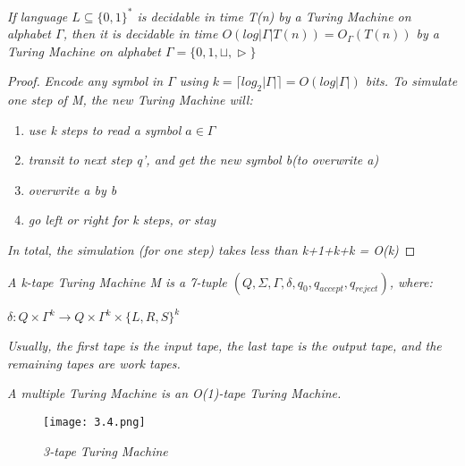\documentclass{article}
\begin{document}
\begin{lemma}
    \textit{If language $L\subseteq \{0,1\}^*$ is decidable in time T(n) by a Turing Machine on alphabet $\varGamma$, then it is decidable in time $O(log|\varGamma| T(n)) = O_\varGamma(T(n))$ by a Turing Machine on alphabet $\varGamma = \{0,1,\sqcup,\vartriangleright  \}$}

    \begin{proof}
        \textit{Encode any symbol in $\varGamma$ using $k = \lceil log_2|\varGamma|\rceil = O(log|\varGamma|)$ bits. To simulate one step of M, the new Turing Machine will:}

        \begin{enumerate}
            \item \textit{use k steps to read a symbol $a\in \varGamma$}
            \item \textit{transit to next step q', and get the new symbol b(to overwrite a)}
            \item \textit{overwrite a by b}
            \item \textit{go left or right for k steps, or stay}
        \end{enumerate}

        \textit{In total, the simulation (for one step) takes less than k+1+k+k = O(k)}
    \end{proof}
\end{lemma}

\begin{defn}
    \textit{A k-tape Turing Machine M is a 7-tuple $(Q,\Sigma,\varGamma,\delta,q_0,q_{accept},q_{reject})$, where:}
    
    $\delta:Q\times\varGamma^k\rightarrow Q\times\varGamma^k\times\{L,R,S\}^k$

    \textit{Usually, the first tape is the input tape, the last tape is the output tape, and the remaining tapes are work tapes.}

    \textit{A multiple Turing Machine is an O(1)-tape Turing Machine.}

    \begin{figure}[H]
        \begin{center}
            \texttt{[image: 3.4.png]}
        \end{center}
        \caption{\textit{3-tape Turing Machine}}
    \end{figure}
\end{defn}
\end{document}
